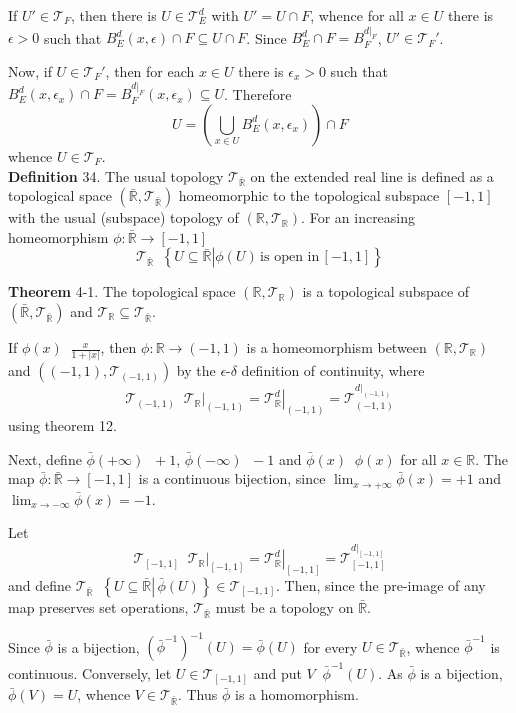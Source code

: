 \documentclass[a4paper]{article}
\newcommand{\obj}[1]{\left\{ #1 \right \}}
\newcommand{\clo}[1]{\left [ #1 \right ]}
\newcommand{\brac}[1]{\left ( #1 \right )}
\newcommand{\induc}[1]{\left . #1 \right \vert}
\newcommand{\abs}[1]{\left | #1 \right |}
\newcommand{\Rbar}{{\bar{\mathbb{R}}}}
\newcommand{\Real}{\mathbb{R}}
\newcommand{\Tcal}{\mathcal{T}}
\newcommand{\defn}{\mathop{\overset{\Delta}{=}}\nolimits}
\begin{document}
If $U'\in \Tcal_F$, then there is $U\in\Tcal_E^d$ with $U'=U\cap F$, whence for all $x\in U$ there is $\epsilon>0$ such that $B^d_E\brac{x,\epsilon}\cap F \subseteq U\cap F$. Since $B^d_E\cap F=B^{\induc{d}_F}_F$, $U'\in \Tcal_F'$.

Now, if $U\in \Tcal_F'$, then for each $x\in U$ there is $\epsilon_x>0$ such that $B^d_E\brac{x,\epsilon_x}\cap F=B^{\induc{d}_F}_F\brac{x,\epsilon_x}\subseteq U$. Therefore \[U = \brac{\bigcup_{x\in U} B^d_E\brac{x,\epsilon_x}}\cap F\] whence $U\in \Tcal_F$.\\

\noindent \textbf{Definition} 34.
The usual topology $\Tcal_\Rbar$ on the extended real line is defined as a topological space $\brac{\Rbar, \Tcal_\Rbar}$ homeomorphic to the topological subspace $\clo{-1, 1}$ with the usual (subspace) topology of $\brac{\Real, \Tcal_\Real}$. For an increasing homeomorphism $\phi:\Rbar\to\clo{-1, 1}$ \[\Tcal_\Rbar \defn \obj{\induc{ U\subseteq \Rbar } \phi\brac{U}\, \text{is open in}\,\clo{-1,1} }\]

\label{thm:rbar_topology} \noindent \textbf{Theorem} 4-1.
The topological space $\brac{\Real, \Tcal_\Real}$ is a topological subspace of $\brac{\Rbar, \Tcal_\Rbar}$ and $\Tcal_\Real\subseteq \Tcal_\Rbar$.

If $\phi\brac{x}\defn\frac{x}{1+\abs{x}}$, then $\phi:\Real\to\brac{-1,1}$ is a homeomorphism between $\brac{\Real, \Tcal_\Real}$ and $\brac{\brac{-1,1}, \Tcal_{\brac{-1,1}}}$ by the $\epsilon$-$\delta$ definition of continuity, where \[\Tcal_{\brac{-1,1}}\defn\induc{\Tcal_\Real}_{\brac{-1,1}}=\induc{\Tcal^d_\Real}_{\brac{-1,1}}=\Tcal^{\induc{d}_{\brac{-1,1}}}_{\brac{-1,1}}\] using theorem 12.

Next, define $\bar{\phi}\brac{+\infty}\defn+1$, $\bar{\phi}\brac{-\infty}\defn-1$ and $\bar{\phi}\brac{x}\defn\phi\brac{x}$ for all $x\in \Real$. The map $\bar{\phi}:\Rbar\to\clo{-1,1}$ is a continuous bijection, since $\lim_{x\to+\infty}\bar{\phi}\brac{x}=+1$ and $\lim_{x\to-\infty}\bar{\phi}\brac{x}=-1$.

Let \[\Tcal_{\clo{-1,1}}\defn\induc{\Tcal_\Real}_{\clo{-1,1}}=\induc{\Tcal^d_\Real}_{\clo{-1,1}}=\Tcal^{\induc{d}_{\clo{-1,1}}}_{\clo{-1,1}}\] and define $\Tcal_\Rbar\defn \obj{\induc{U\subseteq \Rbar}\,\bar{\phi}\brac{U}} \in \Tcal_{\clo{-1,1}}$. Then, since the pre-image of any map preserves set operations, $\Tcal_\Rbar$ must be a topology on $\Rbar$.

Since $\bar{\phi}$ is a bijection, $\brac{\bar{\phi}^{-1}}^{-1}\brac{U}=\bar{\phi}\brac{U}$  for every $U\in \Tcal_\Rbar$, whence $\bar{\phi}^{-1}$ is continuous. Conversely, let $U\in \Tcal_{\clo{-1,1}}$ and put $V\defn\bar{\phi}^{-1}\brac{U}$. As $\bar{\phi}$ is a bijection, $\bar{\phi}\brac{V} = U$, whence $V\in \Tcal_\Rbar$. Thus $\bar{\phi}$ is a homomorphism.
\end{document}
